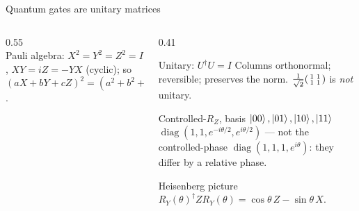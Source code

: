 \documentclass[aspectratio=169,11pt]{beamer}
\begin{document}
\begin{frame}[label=fGates]{Quantum gates are unitary matrices}
  \begin{columns}[T]
    \begin{column}{0.55\textwidth}
      \footnotesize
{}\\[4pt]
      Pauli algebra: $X^2 = Y^2 = Z^2 = I$, $XY = iZ = -YX$ (cyclic); so $(aX + bY + cZ)^2 = (a^2 + b^2 + c^2)I$.
    \end{column}
    \begin{column}{0.41\textwidth}
      \begin{block}{Unitary: $U^\dagger U = I$}
        \scriptsize Columns orthonormal; reversible; preserves the norm. $\frac{1}{\sqrt2}\begin{psmallmatrix}1&1\\1&1\end{psmallmatrix}$ is \emph{not} unitary.
      \end{block}
      \begin{exampleblock}{Controlled-$R_Z$, basis $\ket{00},\ket{01},\ket{10},\ket{11}$}
        \scriptsize $\operatorname{diag}(1, 1, e^{-i\theta/2}, e^{i\theta/2})$ --- not the controlled-phase $\operatorname{diag}(1,1,1,e^{i\theta})$:
        they differ by a relative phase.
      \end{exampleblock}
      \begin{block}{Heisenberg picture}
        \scriptsize $R_Y(\theta)^\dagger ZR_Y(\theta) = \cos\theta\,Z - \sin\theta\,X$.
      \end{block}
    \end{column}
  \end{columns}
\end{frame}
\end{document}
